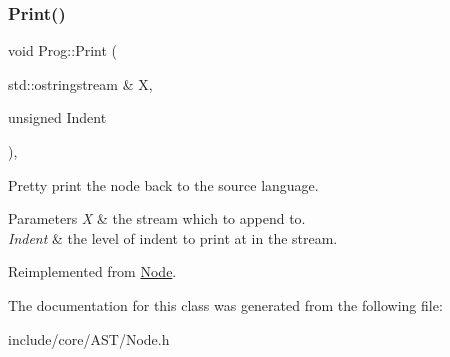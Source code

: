 \mbox{\label{class_prog_aadfb046d4096b256eea11e3171b8d399}} 
\subsubsection{\texorpdfstring{Print()}{Print()}}
{\footnotesize\ttfamily void Prog\+::\+Print (\begin{DoxyParamCaption}\item[{std\+::ostringstream \&}]{X,  }\item[{unsigned}]{Indent }\end{DoxyParamCaption})\hspace{0.3cm}{\ttfamily [override]}, {\ttfamily [virtual]}}

Pretty print the node back to the source language. 
\begin{DoxyParams}{Parameters}
{\em X} & the stream which to append to. \\
\hline
{\em Indent} & the level of indent to print at in the stream. \\
\hline
\end{DoxyParams}


Reimplemented from \mbox{\hyperlink{class_node_a5325b760a6e6fe94227c0cff53af2c45}{Node}}.



The documentation for this class was generated from the following file\+:\begin{DoxyCompactItemize}
\item 
include/core/\+A\+S\+T/Node.\+h\end{DoxyCompactItemize}
